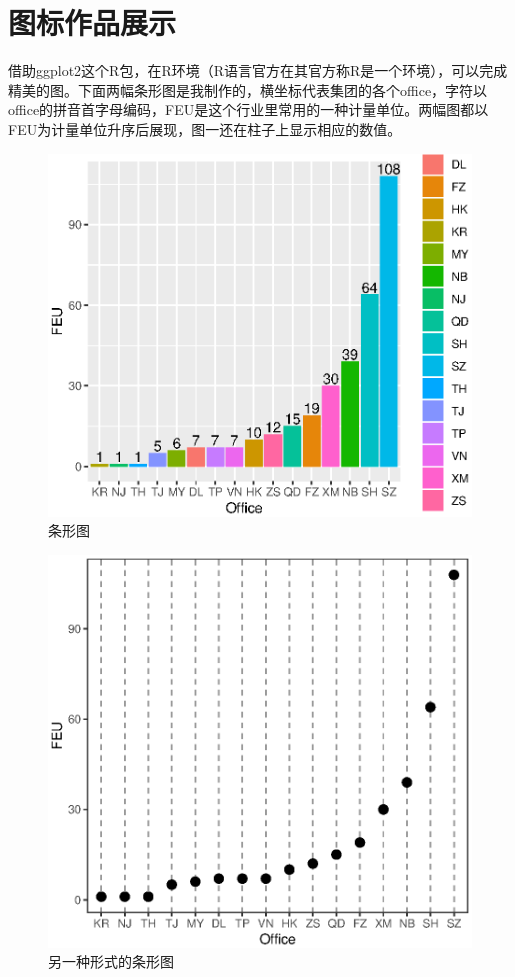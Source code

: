 \section{图标作品展示}
借助ggplot2这个R包，在R环境（R语言官方在其官方称R是一个环境），可以完成精美的图。下面两幅条形图是我制作的，横坐标代表集团的各个office，字符以office的拼音首字母编码，FEU是这个行业里常用的一种计量单位。两幅图都以FEU为计量单位升序后展现，图一还在柱子上显示相应的数值。
\begin{figure}[h]
	\begin{center}
		\caption{条形图}
		\includegraphics[scale=0.70]{eps/Rplot01}
	\end{center}
\end{figure}
\begin{figure}[h]
	\begin{center}
		\caption{另一种形式的条形图}
		\includegraphics[scale=0.70]{eps/Rplot13}
	\end{center}
\end{figure}
